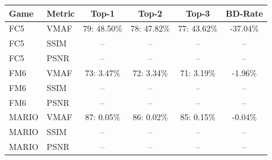 \begin{tabular}{llcccc}
\toprule
Game & Metric & Top-1 & Top-2 & Top-3 & BD-Rate \\
\midrule
FC5 & VMAF & 79: 48.50\% & 78: 47.82\% & 77: 43.62\% & -37.04\% \\
FC5 & SSIM & -- & -- & -- & -- \\
FC5 & PSNR & -- & -- & -- & -- \\
\midrule
FM6 & VMAF & 73: 3.47\% & 72: 3.34\% & 71: 3.19\% & -1.96\% \\
FM6 & SSIM & -- & -- & -- & -- \\
FM6 & PSNR & -- & -- & -- & -- \\
\midrule
MARIO & VMAF & 87: 0.05\% & 86: 0.02\% & 85: 0.15\% & -0.04\% \\
MARIO & SSIM & -- & -- & -- & -- \\
MARIO & PSNR & -- & -- & -- & -- \\
\bottomrule
\end{tabular}
